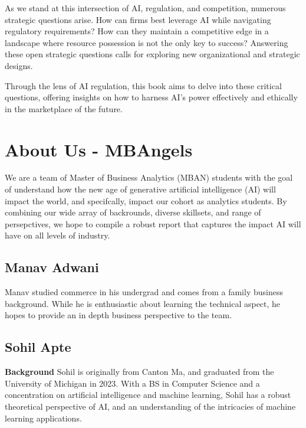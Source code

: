 \documentclass[
]{book}
\begin{document}
As we stand at this intersection of AI, regulation, and competition, numerous strategic questions arise. How can firms best leverage AI while navigating regulatory requirements? How can they maintain a competitive edge in a landscape where resource possession is not the only key to success? Answering these open strategic questions calls for exploring new organizational and strategic designs.

Through the lens of AI regulation, this book aims to delve into these critical questions, offering insights on how to harness AI's power effectively and ethically in the marketplace of the future.

\hypertarget{about-us---mbangels}{%
\chapter{About Us - MBAngels}\label{about-us---mbangels}}

We are a team of Master of Business Analytics (MBAN) students with the goal of understand how the new age of generative artificial intelligence (AI) will impact the world, and specifcally, impact our cohort as analytics students. By combining our wide array of backrounds, diverse skillsets, and range of persepctives, we hope to compile a robust report that captures the impact AI will have on all levels of industry.

\hypertarget{manav-adwani}{%
\section{Manav Adwani}\label{manav-adwani}}

Manav studied commerce in his undergrad and comes from a family business background. While he is enthusiastic about learning the technical aspect, he hopes to provide an in depth business perspective to the team.

\hypertarget{sohil-apte}{%
\section{Sohil Apte}\label{sohil-apte}}

\textbf{Background}
Sohil is originally from Canton Ma, and graduated from the University of Michigan in 2023. With a BS in Computer Science and a concentration on artificial intelligence and machine learning, Sohil has a robust theoretical perspective of AI, and an understanding of the intricacies of machine learning applications.
\end{document}
